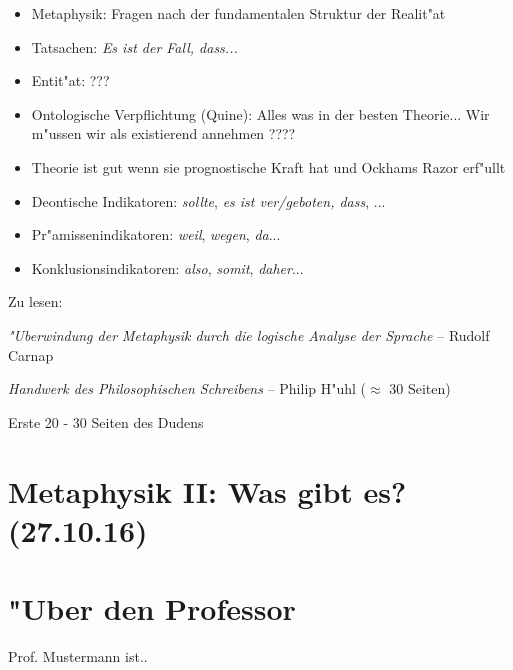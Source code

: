 \documentclass[]{scrartcl}
\begin{document}
\begin{itemize}
  \item Metaphysik: Fragen nach der fundamentalen Struktur der Realit"at
  \item Tatsachen: \emph{Es ist der Fall, dass...}
  \item Entit"at: ???
  \item Ontologische Verpflichtung (Quine): Alles was in der besten Theorie... Wir m"ussen wir als existierend annehmen ????
  \item Theorie ist gut wenn sie prognostische Kraft hat und Ockhams Razor erf"ullt
  \item Deontische Indikatoren: \emph{sollte}, \emph{es ist ver/geboten, dass}, ...
  \item Pr"amissenindikatoren: \emph{weil}, \emph{wegen}, \emph{da}...
  \item Konklusionsindikatoren: \emph{also}, \emph{somit}, \emph{daher}...
\end{itemize}

Zu lesen: 

\emph{"Uberwindung der Metaphysik durch die logische Analyse der Sprache} -- Rudolf Carnap

\emph{Handwerk des Philosophischen Schreibens} -- Philip H"uhl ($\approx$ 30 Seiten)

Erste 20 - 30 Seiten des Dudens

\section{Metaphysik II: Was gibt es?\\(27.10.16)}




\newpage
\section{"Uber den Professor}
Prof. Mustermann ist..
\end{document}
